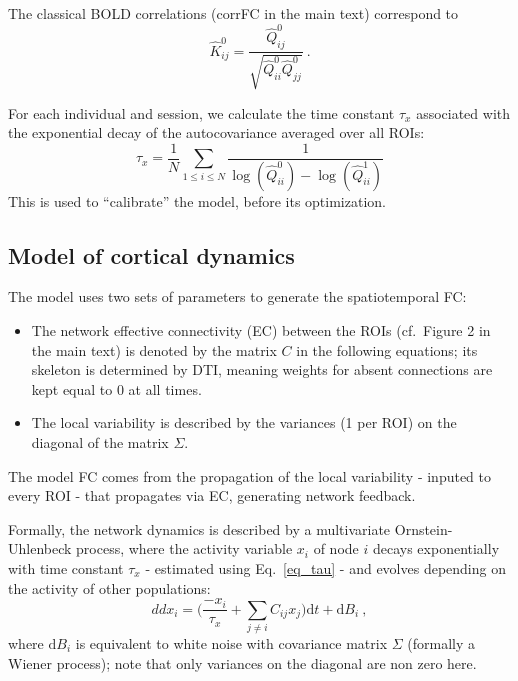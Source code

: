 \documentclass{article}
\newcommand{\dd}{\mathrm{d}}
\begin{document}
The classical BOLD correlations (corrFC in the main text) correspond to 
\begin{equation} \label{eq_emp_corr}
\widehat{K}^0_{ij} = \frac{\widehat{Q}^0_{ij}}{\sqrt{\widehat{Q}^0_{ii} \widehat{Q}^0_{jj}}}
\ .
\end{equation}

For each individual and session, we calculate the time constant $\tau_x$ associated with the exponential decay of the autocovariance averaged over all ROIs:
\begin{equation} \label{eq_tau}
\tau_x = \frac{1}{N} \sum_{1 \leq i \leq N} \frac{1}{\log(\widehat{Q}^0_{ii}) - \log(\widehat{Q}^1_{ii})}
\end{equation}
This is used to ``calibrate'' the model, before its optimization. 

\subsection{Model of cortical dynamics}

The model uses two sets of parameters to generate the spatiotemporal FC:
\begin{itemize}
\item The network effective connectivity (EC) between the ROIs (cf.\ Figure 2 in the main text) is denoted by the matrix $C$ in the following equations; its skeleton is determined by DTI, meaning weights for absent connections are kept equal to 0 at all times.
\item The local variability is described by the variances (1 per ROI) on the diagonal of the matrix $\Sigma$.
\end{itemize}
The model FC comes from the propagation of the local variability - inputed to every ROI - that propagates via EC, generating network feedback.

Formally, the network dynamics is described by a multivariate Ornstein-Uhlenbeck process, where the activity variable $x_i$ of node $i$ decays exponentially with time constant $\tau_x$ - estimated using Eq.~\eqref{eq_tau} - and evolves depending on the activity of other populations:
\begin{equation}
dd x_i = \big( \frac{- x_i}{\tau_x} + \sum_{j \neq i} C_{ij} x_j \big) \dd t + \dd B_i
\ ,
\end{equation}
where $\dd B_i$ is equivalent to white noise with covariance matrix $\Sigma$ (formally a Wiener process); note that only variances on the diagonal are non zero here.
\end{document}

